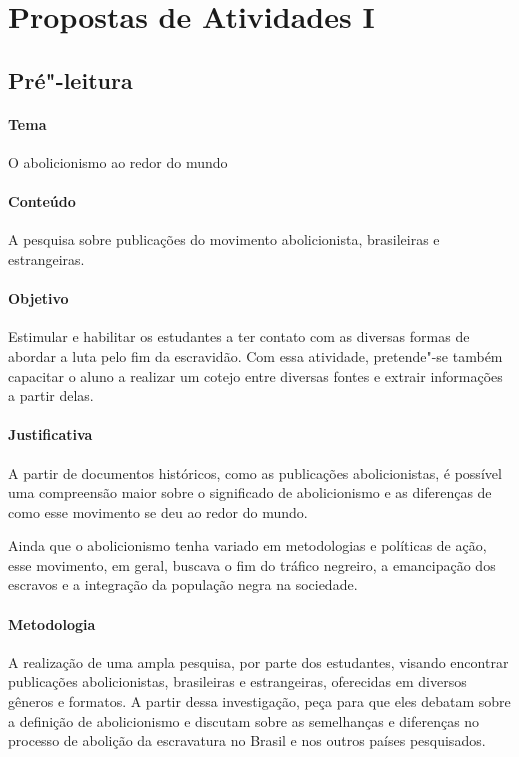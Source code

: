\documentclass[12pt]{extarticle}
\begin{document}
\tableofcontents


\section{Propostas de Atividades I}


\subsection{Pré"-leitura}

\paragraph{Tema} O abolicionismo ao redor do mundo


\paragraph{Conteúdo} A pesquisa sobre publicações do movimento abolicionista, brasileiras e estrangeiras.

\paragraph{Objetivo} Estimular e habilitar os estudantes a ter contato
com as diversas formas de abordar a luta pelo fim da escravidão. 
Com essa atividade, pretende"-se também capacitar o aluno a
realizar um cotejo entre diversas fontes e extrair informações a partir delas.


\paragraph{Justificativa} A partir de documentos históricos, como as publicações abolicionistas,
é possível uma compreensão maior sobre o significado de abolicionismo e as diferenças de 
como esse movimento se deu ao redor do mundo.

Ainda que o abolicionismo tenha variado em metodologias e
políticas de ação, esse movimento, em geral, buscava o fim do tráfico
negreiro, a emancipação dos escravos e a integração da população negra
na sociedade.

\paragraph{Metodologia} A realização de uma ampla pesquisa, por parte dos estudantes,
visando encontrar publicações abolicionistas, brasileiras e estrangeiras, 
oferecidas em diversos gêneros e formatos. A partir dessa investigação, peça para que 
eles debatam sobre a definição de abolicionismo e discutam sobre as semelhanças e 
diferenças no processo de abolição da escravatura no Brasil e nos outros países pesquisados.
\end{document}
